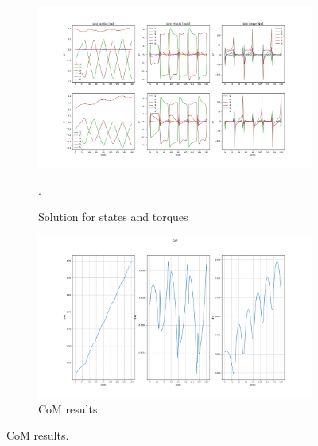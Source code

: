 \begin{figure}[h!]
\centering
\begin{subfigure}{1\textwidth}
  \centering
  \includegraphics[width=1\linewidth]{Media/Crocoddyl/RH5Legs/FixedPeriodicity/RH5PeriodicGait_Solution.png}
  \caption{Solution for states and torques}.
\end{subfigure}
\begin{subfigure}{1\textwidth}
  \centering
  \includegraphics[width=1\linewidth]{Media/Crocoddyl/RH5Legs/FixedPeriodicity/RH5PeriodicGait_CoM.png}
\caption{CoM results.}
\end{subfigure}
\end{figure}
